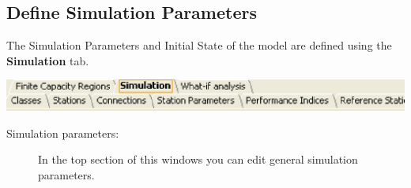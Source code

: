 \begin{description*}
\subsection{Define Simulation Parameters}
\label{sec:DefineSimulationParameters}
The Simulation Parameters and Initial State of the model are defined using the \textbf{Simulation} tab.
\begin{center}
\includegraphics[scale=.5]{img/jsim/sim_tabs.eps}
\end{center}
\begin{description}
\item [Simulation parameters:] In the top section of this windows
you can edit general simulation parameters.
\begin{figure}
\begin{center}
\end{center}
\end{figure}


\end{description}
\end{description*}
